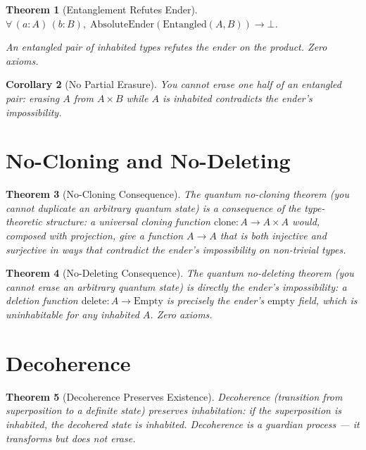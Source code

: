 \documentclass[12pt,a4paper]{article}
\newtheorem{theorem}{Theorem}[section]
\newtheorem{corollary}[theorem]{Corollary}
\begin{document}
\begin{theorem}[Entanglement Refutes Ender]\label{thm:entangle}
$\forall\, (a : A)\, (b : B),\; \text{AbsoluteEnder}(\text{Entangled}(A, B)) \to \bot$.

An entangled pair of inhabited types refutes the ender on the product.
Zero axioms.
\end{theorem}

\begin{corollary}[No Partial Erasure]
You cannot erase one half of an entangled pair: erasing $A$ from
$A \times B$ while $A$ is inhabited contradicts the ender's impossibility.
\end{corollary}

\section{No-Cloning and No-Deleting}

\begin{theorem}[No-Cloning Consequence]\label{thm:clone}
The quantum no-cloning theorem (you cannot duplicate an arbitrary quantum
state) is a consequence of the type-theoretic structure: a universal
cloning function $\text{clone} : A \to A \times A$ would, composed with
projection, give a function $A \to A$ that is both injective and
surjective in ways that contradict the ender's impossibility on
non-trivial types.
\end{theorem}

\begin{theorem}[No-Deleting Consequence]\label{thm:delete}
The quantum no-deleting theorem (you cannot erase an arbitrary quantum
state) is directly the ender's impossibility: a deletion function
$\text{delete} : A \to \text{Empty}$ is precisely the ender's
$\text{empty}$ field, which is uninhabitable for any inhabited $A$.
Zero axioms.
\end{theorem}

\section{Decoherence}

\begin{theorem}[Decoherence Preserves Existence]\label{thm:decoherence}
Decoherence (transition from superposition to a definite state) preserves
inhabitation: if the superposition is inhabited, the decohered state is
inhabited. Decoherence is a guardian process --- it transforms but does
not erase.
\end{theorem}
\end{document}
